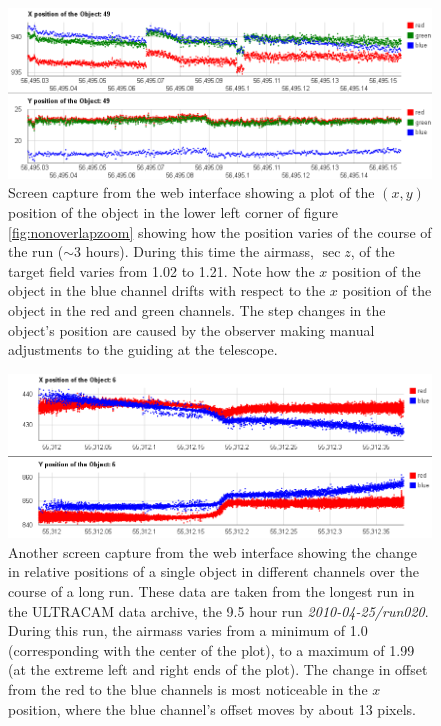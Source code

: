 \begin{figure}
  \centering
  \includegraphics[width=140mm]{images/position_drift.png}
  \caption{Screen capture from the web interface showing a plot of the $(x, y)$ position of the object in the lower left corner of figure \ref{fig:nonoverlapzoom} showing how the position varies of the course of the run ($\sim 3$ hours). During this time the airmass, $\sec z$, of the target field varies from 1.02 to 1.21. Note how the $x$ position of the object in the blue channel drifts with respect to the $x$ position of the object in the red and green channels. The step changes in the object's position are caused by the observer making manual adjustments to the guiding at the telescope. }
\label{fig:positiondrift}
\end{figure}

\begin{figure}
  \centering
  \includegraphics[width=140mm]{images/position_drift_longrun.png}
   \caption{Another screen capture from the web interface showing the change in relative positions of a single object in different channels over the course of a long run. These data are taken from the longest run in the ULTRACAM data archive, the 9.5 hour run \emph{2010-04-25/run020}. During this run, the airmass varies from a minimum of 1.0 (corresponding with the center of the plot), to a maximum of 1.99 (at the extreme left and right ends of the plot). The change in offset from the red to the blue channels is most noticeable in the $x$ position, where the blue channel's offset moves by about 13 pixels. }
\label{fig:positiondriftlongrun}
\end{figure}

